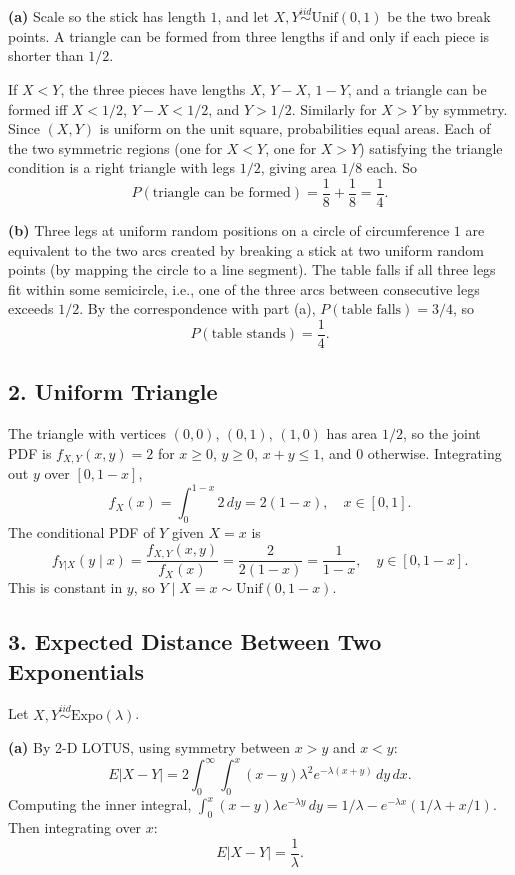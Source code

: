 \documentclass{article}
\begin{document}
\textbf{(a)} Scale so the stick has length $1$, and let $X,Y\overset{iid}{\sim}\text{Unif}(0,1)$ be the two break points. A triangle can be formed from three lengths if and only if each piece is shorter than $1/2$.

If $X<Y$, the three pieces have lengths $X$, $Y-X$, $1-Y$, and a triangle can be formed iff $X<1/2$, $Y-X<1/2$, and $Y>1/2$. Similarly for $X>Y$ by symmetry. Since $(X,Y)$ is uniform on the unit square, probabilities equal areas. Each of the two symmetric regions (one for $X<Y$, one for $X>Y$) satisfying the triangle condition is a right triangle with legs $1/2$, giving area $1/8$ each. So
$$
P(\text{triangle can be formed}) = \frac{1}{8}+\frac{1}{8} = \frac{1}{4}.
$$

\textbf{(b)} Three legs at uniform random positions on a circle of circumference $1$ are equivalent to the two arcs created by breaking a stick at two uniform random points (by mapping the circle to a line segment). The table falls if all three legs fit within some semicircle, i.e., one of the three arcs between consecutive legs exceeds $1/2$. By the correspondence with part (a), $P(\text{table falls}) = 3/4$, so
$$
P(\text{table stands}) = \frac{1}{4}.
$$

\subsection*{2. Uniform Triangle}

The triangle with vertices $(0,0)$, $(0,1)$, $(1,0)$ has area $1/2$, so the joint PDF is $f_{X,Y}(x,y)=2$ for $x\ge0$, $y\ge0$, $x+y\le1$, and $0$ otherwise. Integrating out $y$ over $[0,1-x]$,
$$
f_X(x) = \int_0^{1-x}2\,dy = 2(1-x), \quad x\in[0,1].
$$
The conditional PDF of $Y$ given $X=x$ is
$$
f_{Y|X}(y\mid x) = \frac{f_{X,Y}(x,y)}{f_X(x)} = \frac{2}{2(1-x)} = \frac{1}{1-x}, \quad y\in[0,1-x].
$$
This is constant in $y$, so $Y\mid X=x\sim\text{Unif}(0,1-x)$.

\subsection*{3. Expected Distance Between Two Exponentials}

Let $X,Y\overset{iid}{\sim}\text{Expo}(\lambda)$.

\textbf{(a)} By 2-D LOTUS, using symmetry between $x>y$ and $x<y$:
$$
E|X-Y| = 2\int_0^\infty\int_0^x(x-y)\lambda^2 e^{-\lambda(x+y)}\,dy\,dx.
$$
Computing the inner integral, $\int_0^x(x-y)\lambda e^{-\lambda y}\,dy = 1/\lambda - e^{-\lambda x}(1/\lambda + x/1)$. Then integrating over $x$:
$$
E|X-Y| = \frac{1}{\lambda}.
$$
\end{document}
